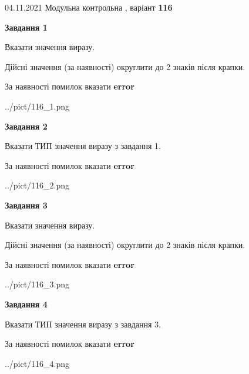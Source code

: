 \documentclass[11pt, ukrainian]{article}
\begin{document}
{04.11.2021 Модульна контрольна , варіант  \No \textbf { 116 }\par}
{
\begin {large}
{\begin {center}\textbf{Завдання 1}\end {center}}\par
Вказати значення виразу. \par
Дійсні значення (за наявності) округлити до 2 знаків після крапки. \par
За наявності помилок вказати \textbf{error}

\begin{center}
	{../pict/116_1.png}
\end{center}
\newpage

{\begin {center}\textbf{Завдання 2}\end {center}}\par
Вказати ТИП значення виразу з завдання 1. \par
За наявності помилок вказати \textbf{error}

\begin{center}
	{../pict/116_2.png}
\end{center}
\newpage

{\begin {center}\textbf{Завдання 3}\end {center}}\par
Вказати значення виразу. \par
Дійсні значення (за наявності) округлити до 2 знаків після крапки. \par
За наявності помилок вказати \textbf{error}

\begin{center}
	{../pict/116_3.png}
\end{center}
\newpage

{\begin {center}\textbf{Завдання 4}\end {center}}\par
Вказати ТИП значення виразу з завдання 3. \par
За наявності помилок вказати \textbf{error}

\begin{center}
	{../pict/116_4.png}
\end{center}
\newpage


\end{large}}
\end{document}
